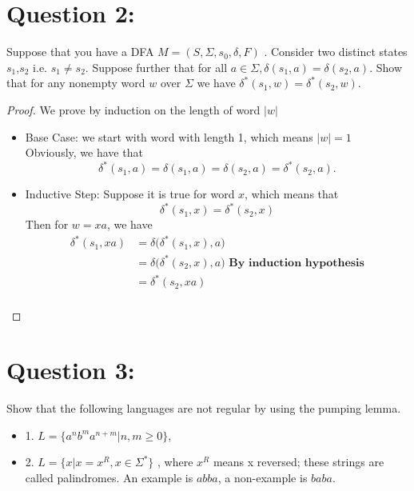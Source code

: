 \documentclass [9 pt]{article}
\theoremstyle{definition}
\begin{document}
\section*{Question 2:}
Suppose that you have a DFA $M = (S,\Sigma,s_0,\delta,F)$ . Consider two distinct states $s_1$,$s_2$ i.e. $s_1 \neq s_2$. Suppose further that for all $a \in \Sigma, \delta(s_1,a) = \delta(s_2,a)$. Show that for any nonempty word $w$ over $\Sigma$ we have  $\delta^{*}  (s_1,w) = \delta^{*} (s_2, w)$.
\begin{proof}
	We prove by induction on the length of word $|w|$
	\begin{itemize}
		\item Base Case: we start with word with length 1, which means $|w| = 1$\\
		Obviously, we have that $$\delta^*(s_1,a) = \delta(s_1,a) = \delta(s_2,a) = \delta^*(s_2,a).$$
		\item Inductive Step: Suppose it is true for word $x$, which means that 
		$$ \delta^{*}  (s_1,x) = \delta^{*} (s_2, x) $$
		Then for $w = x a$, we have
		\begin{align*}
			\delta^{*}  (s_1,xa) 
			&= \delta\bigg( \delta^{*}  (s_1,x), a \bigg)\\
			&= \delta\bigg( \delta^{*}  (s_2,x), a \bigg) \textbf{ By induction hypothesis} \\
			&=  \delta^{*}  (s_2,xa )\\
		\end{align*}
	\end{itemize}
\end{proof}








\newpage
\section*{Question 3:}
Show that the following languages are not regular by using the pumping lemma.
\begin{itemize}
	\item 1. $L = \{a^nb^ma^{n+m}|n, m \geq 0\}$,
 	\item 2. $L = \{x|x = x^R, x \in \Sigma^*\}$ , where $x^R$ means x reversed; these strings are called palindromes. An example is $abba$, a non-example is $baba$.
\end{itemize}
\end{document}
